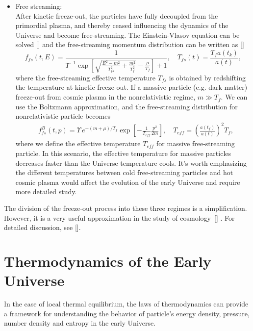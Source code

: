 \begin{itemize}
\item{Free streaming:}\\
After kinetic freeze-out, the particles have fully decoupled from the primordial plasma, and thereby ceased influencing the dynamics of the Universe and become free-streaming. The Einstein-Vlasov equation can be solved [\cite{choquet2008general}] and the free-streaming momentum distribution can be written as [\cite{Birrell:2012gg}]
\begin{equation}\label{free_stream_dist}
f_{fs}(t,E)=\frac{1}{\Upsilon^{-1}\exp{\left[\sqrt{\frac{E^2-m^2}{T_{fs}^2}+\frac{m^2}{T^2_f}}-\frac{\mu}{T_f}\right]+1}},\quad T_{fs}(t)=\frac{T_fa(t_k)}{a(t)},
\end{equation}
where the free-streaming effective temperature $T_{fs}$ is obtained by redshifting the temperature at kinetic freeze-out. If a massive particle (e.g. dark matter) freeze-out from cosmic plasma in the nonrelativistic regime, $m\gg T_f$. We can use the
Boltzmann approximation, and the free-streaming distribution for nonrelativistic particle becomes
\begin{align}
&f^B_{fs}(t,p)=\Upsilon\,e^{-(m+\mu)/T_f}\exp\left[-\frac{1}{ T_{eff}}\frac{p^2}{2m}\right],\quad T_{eff}=\left(\frac{a(t_f)}{a(t)}\right)^2T_f,
\end{align}
where we define the effective temperature $T_{eff}$ for massive free-streaming particle. In this scenario, the effective temperature for massive particles decreases faster than the Universe temperature cools. It's worth emphasizing the different temperatures between cold free-streaming particles and hot cosmic plasma would affect the evolution of the early Universe and require more detailed study. 
\end{itemize}

The division of the freeze-out process into these three regimes is a simplification. However, it is a very useful approximation in the study of cosmology~[\cite{Mangano:2005cc,Birrell:2014gea}] . For detailed discussion, see [\cite{Birrell:2012gg,Rafelski:2023emw}].




\section{Thermodynamics of the Early Universe}
In the case of local thermal equilibrium, the laws of thermodynamics can provide a framework for understanding the behavior of particle's energy density, pressure, number density and entropy in the early Universe.

